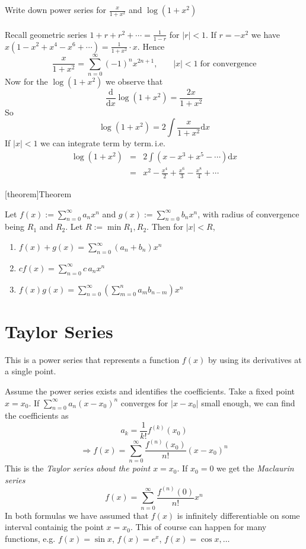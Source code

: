 \documentclass[12pt]{report}
\theoremstyle{definition}
\begin{document}
\begin{ex}
    Write down power series for $\frac{x}{1+x^{2}}$ and $\log{(1+x^{2})}$
    \\\\Recall geometric series $1+r+r^{2}+\cdots = \frac{1}{1-r}$ for $|r| < 1$.
    If $r = -x^{2}$ we have $x(1-x^{2}+x^{4}-x^{6}+\cdots) = \frac{1}{1+x^{2}} \cdot x$. Hence\[
        \frac{x}{1+x^{2}} = \sum_{n=0}^{\infty} {(-1)}^{n}x^{2n+1}\text{,} \qquad |x| < 1 \;\text{for convergence}
    \]Now for the $\log{(1+x^{2})}$ we observe that \[
    \frac{\mathrm{d}}{\mathrm{d}x} \log{(1+x^{2})} = \frac{2x}{1+x^{2}} %
    \]So\[
    \log{(1+x^{2})} = 2\int \frac{x}{1+x^{2}} \mathrm{d}x
    \]If $|x| < 1$ we can integrate term by term.\,i.e.
    \begin{eqnarray*}
        \log{(1+x^{2})} &=& 2\int (x - x^{3} + x^{5} - \cdots)\mathrm{d}x \\
                        &=& x^{2} - \frac{x^{4}}{2} + \frac{x^{6}}{3} - \frac{x^{8}}{4} + \cdots
    \end{eqnarray*}
\end{ex}
[theorem]{Theorem}
\begin{power series algebraic operations}
    Let $f(x) := \sum_{n=0}^{\infty} a_n x^{n}$ and $g(x) := \sum_{n=0}^{\infty} b_n x^{n}$,
    with radius of convergence being $R_1$ and $R_2$. Let $R:=\min{R_1, R_2}$. Then for $|x| < R$,
    \begin{enumerate}[label = (\arabic*)]
        \item $f(x) + g(x) = \sum_{n=0}^{\infty} (a_n + b_n)x^{n}$
        \item $cf(x) = \sum_{n=0}^{\infty} c\,a_n x^{n}$
        \item $f(x)g(x) = \sum_{n=0}^{\infty} \left(\sum_{m=0}^{n} a_m b_{n-m}\right) x^{n}$
    \end{enumerate}
\end{power series algebraic operations}

\section{Taylor Series}
This is a power series that represents a function $f(x)$ by using its derivatives at a single point.

Assume the power series exists and identifies the coefficients. Take a fixed point $x = x_0$.
If $\sum_{n=0}^{\infty} a_n {(x-x_0)}^n$ converges for $|x-x_0|$ small enough, we can find the coefficients as\[
    a_k = \frac{1}{k!}f^{(k)}(x_0)
\]\[
\Rightarrow f(x) = \sum_{n=0}^{\infty} \frac{f^{(n)}(x_0)}{n!}{(x-x_0)}^{n}
\]This is the \emph{Taylor series about the point $x=x_0$}. If $x_0=0$ we get the \emph{Maclaurin series} \[
f(x) = \sum_{n=0}^{\infty} \frac{f^{(n)}(0)}{n!} x^{n} 
\]In both formulas we have assumed that $f(x)$ is infinitely differentiable on some interval containig the point $x=x_0$.
This of course can happen for many functions, e.g. $f(x) = \sin{x}$, $f(x) = e^{x}$, $f(x) = \cos{x}, \ldots$
\end{document}
